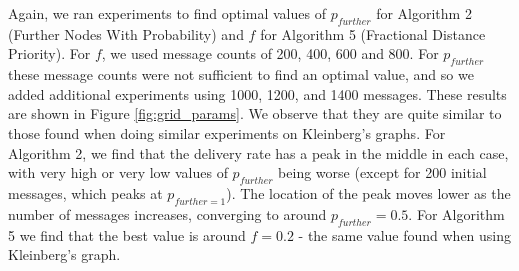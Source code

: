 \documentclass[bsc,frontabs,twoside,singlespacing,parskip,deptreport]{infthesis}     %
\begin{document}
Again, we ran experiments to find optimal values of $p_{further}$ for Algorithm 2 (Further Nodes With Probability) and $f$ for Algorithm 5 (Fractional Distance Priority). For $f$, we used message counts of 200, 400, 600 and 800. For $p_{further}$ these message counts were not sufficient to find an optimal value, and so we added additional experiments using 1000, 1200, and 1400 messages. These results are shown in Figure \ref{fig:grid_params}. We observe that they are quite similar to those found when doing similar experiments on Kleinberg's graphs. For Algorithm 2, we find that the delivery rate has a peak in the middle in each case, with very high or very low values of $p_{further}$ being worse (except for 200 initial messages, which peaks at $p_{further=1}$). The location of the peak moves lower as the number of messages increases, converging to around $p_{further}=0.5$. For Algorithm 5 we find that the best value is around $f=0.2$ - the same value found when using Kleinberg's graph.
\end{document}
